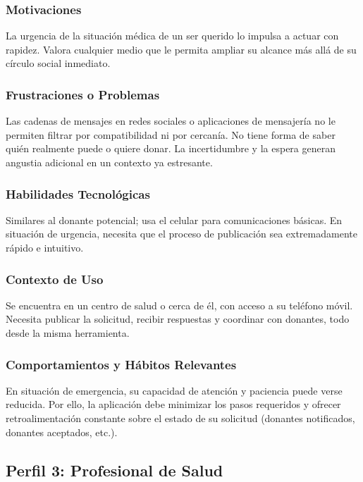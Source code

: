 \subsubsection{Motivaciones}
La urgencia de la situación médica de un ser querido lo impulsa a actuar con rapidez. Valora cualquier medio que le permita ampliar su alcance más allá de su círculo social inmediato.

\subsubsection{Frustraciones o Problemas}
Las cadenas de mensajes en redes sociales o aplicaciones de mensajería no le permiten filtrar por compatibilidad ni por cercanía. No tiene forma de saber quién realmente puede o quiere donar. La incertidumbre y la espera generan angustia adicional en un contexto ya estresante.

\subsubsection{Habilidades Tecnológicas}
Similares al donante potencial; usa el celular para comunicaciones básicas. En situación de urgencia, necesita que el proceso de publicación sea extremadamente rápido e intuitivo.

\subsubsection{Contexto de Uso}
Se encuentra en un centro de salud o cerca de él, con acceso a su teléfono móvil. Necesita publicar la solicitud, recibir respuestas y coordinar con donantes, todo desde la misma herramienta.

\subsubsection{Comportamientos y Hábitos Relevantes}
En situación de emergencia, su capacidad de atención y paciencia puede verse reducida. Por ello, la aplicación debe minimizar los pasos requeridos y ofrecer retroalimentación constante sobre el estado de su solicitud (donantes notificados, donantes aceptados, etc.).

\subsection{Perfil 3: Profesional de Salud}

